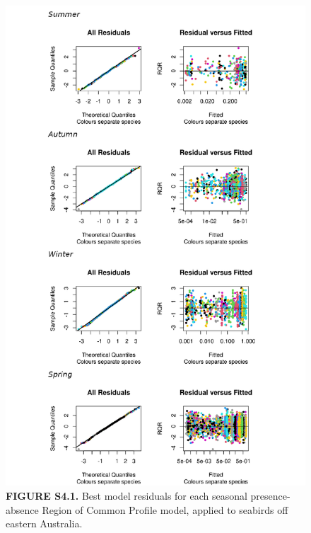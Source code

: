 \documentclass[
]{article}
\begin{document}
\begin{figure}
\centering
\includegraphics{../results/FigS4_1_best-model-residuals-Bernoulli.png}
\caption{\textbf{FIGURE S4.1.} Best model residuals for each seasonal
presence-absence Region of Common Profile model, applied to seabirds off
eastern Australia.}
\end{figure}

\newpage
\end{document}
